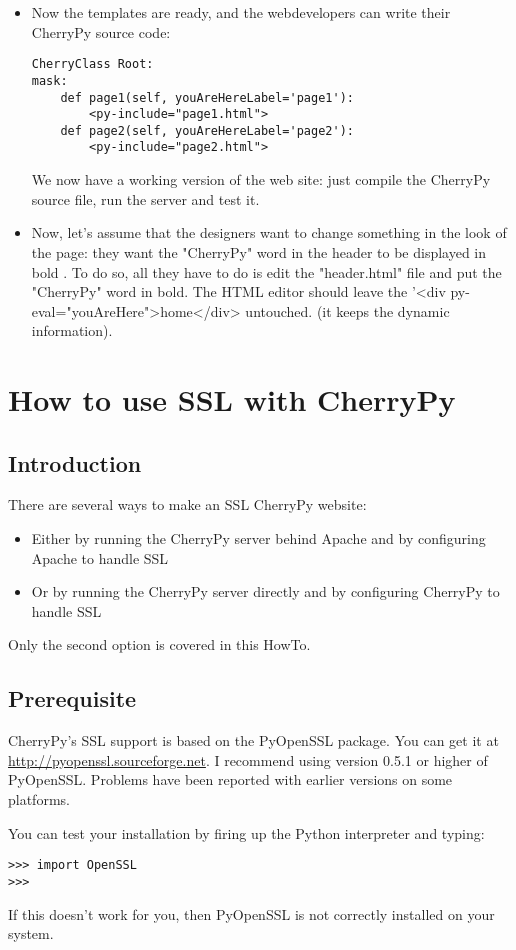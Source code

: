 \documentclass{manual}
\begin{document}
\begin{itemize}
\item
Now the templates are ready, and the webdevelopers can write their CherryPy source code:
\begin{verbatim}
CherryClass Root:
mask:
    def page1(self, youAreHereLabel='page1'):
        <py-include="page1.html">
    def page2(self, youAreHereLabel='page2'):
        <py-include="page2.html">
\end{verbatim}

We now have a working version of the web site: just compile the CherryPy source file, run the server and test it.

\item
Now, let's assume that the designers want to change something in the look of the page: they want the "CherryPy" word in the
header to be displayed in bold . To do so, all they have to do is edit the "header.html" file and put the "CherryPy" word
in bold. The HTML editor should leave the '<div py-eval="youAreHere">home</div> untouched. (it keeps the dynamic information).

\end{itemize}

\chapter{How to use SSL with CherryPy}

\section{Introduction}
There are several ways to make an SSL CherryPy website:
\begin{itemize}
\item
Either by running the CherryPy server behind Apache and by configuring Apache to handle SSL
\item
Or by running the CherryPy server directly and by configuring CherryPy to handle SSL
\end{itemize}
Only the second option is covered in this HowTo.

\section{Prerequisite}
CherryPy's SSL support is based on the PyOpenSSL package. You can get it at \url{http://pyopenssl.sourceforge.net}.
I recommend using version 0.5.1 or higher of PyOpenSSL. Problems have been reported with earlier versions on some platforms.

You can test your installation by firing up the Python interpreter and typing:
\begin{verbatim}
>>> import OpenSSL
>>>
\end{verbatim}
If this doesn't work for you, then PyOpenSSL is not correctly installed on your system.
\end{document}
